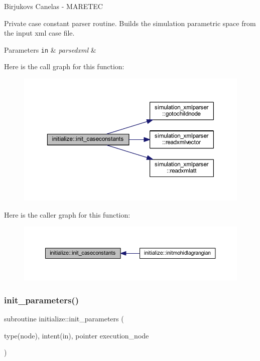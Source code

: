 Birjukovs Canelas -\/ M\+A\+R\+E\+T\+EC 

Private case constant parser routine. Builds the simulation parametric space from the input xml case file. 
\begin{DoxyParams}[1]{Parameters}
\mbox{\tt in}  & {\em parsedxml} & \\
\hline
\end{DoxyParams}
Here is the call graph for this function\+:\nopagebreak
\begin{figure}[H]
\begin{center}
\leavevmode
\includegraphics[width=350pt]{namespaceinitialize_a4c982b312ab10bf112dd3d2bc314569e_cgraph}
\end{center}
\end{figure}
Here is the caller graph for this function\+:\nopagebreak
\begin{figure}[H]
\begin{center}
\leavevmode
\includegraphics[width=350pt]{namespaceinitialize_a4c982b312ab10bf112dd3d2bc314569e_icgraph}
\end{center}
\end{figure}
\mbox{\label{namespaceinitialize_a7a54dc126f448bea2b566339a449f85c}} 
\subsubsection{\texorpdfstring{init\+\_\+parameters()}{init\_parameters()}}
{\footnotesize\ttfamily subroutine initialize\+::init\+\_\+parameters (\begin{DoxyParamCaption}\item[{type(node), intent(in), pointer}]{execution\+\_\+node }\end{DoxyParamCaption})\hspace{0.3cm}{\ttfamily [private]}}



